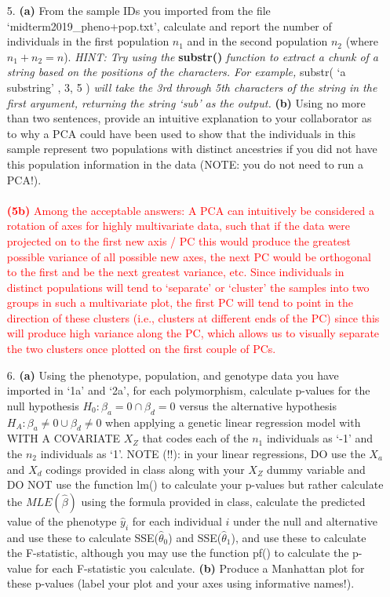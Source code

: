 \documentclass[letterpaper, 11pt]{article}
\begin{document}
\begin{itemize}
\item[5.] \textbf{(a)} From the sample IDs you imported from the file `midterm2019\_pheno+pop.txt', calculate and report the number of individuals in the first population $n_1$ and in the second population $n_2$ (where $n_1 + n_2 = n$).  \textit{ HINT: Try using the }\textbf{substr()} \textit{function to extract a chunk of a string based on the positions of the characters. For example, } substr( `a substring' , 3, 5 ) \textit{ will take the 3rd through 5th characters of the string in the first argument, returning the string `sub' as the output.} \textbf{(b)} Using no more than two sentences, provide an intuitive explanation to your collaborator as to why a PCA could have been used to show that the individuals in this sample represent two populations with distinct ancestries if you did not have this population information in the data (NOTE: you do not need to run a PCA!).
\\
\\
 \textcolor{red}{ 
\textbf{(5b)} Among the acceptable answers: A PCA can intuitively be considered a rotation of axes for highly multivariate data, such that if the data were projected on to the first new axis / PC this would produce the greatest possible variance of all possible new axes, the next PC would be orthogonal to the first and be the next greatest variance, etc.  Since individuals in distinct populations will tend to `separate' or `cluster' the samples into two groups in such a multivariate plot, the first PC will tend to point in the direction of these clusters (i.e., clusters at different ends of the PC) since this will produce high variance along the PC, which allows us to visually separate the two clusters once plotted on the first couple of PCs.
} 

\item[6.] \textbf{(a)} Using the phenotype, population, and genotype data you have imported in `1a' and `2a', for each polymorphism, calculate p-values for the null hypothesis $H_0: \beta_a = 0 \cap \beta_d=0$ versus the alternative hypothesis $H_A: \beta_a \neq 0 \cup \beta_d \neq 0$ when applying a genetic linear regression model with WITH A COVARIATE $X_Z$ that codes each of the $n_1$ individuals as `-1' and the $n_2$ individuals as `1'.  NOTE (!!): in your linear regressions, DO use the $X_a$ and $X_d$ codings provided in class along with your $X_Z$ dummy variable and DO NOT use the function lm() to calculate your p-values but rather calculate the $MLE(\hat{\beta})$ using the formula provided in class, calculate the predicted value of the phenotype $\hat{y}_i$ for each individual $i$ under the null and alternative and use these to calculate SSE($\hat{\theta}_0$) and SSE($\hat{\theta}_1$), and use these to calculate the F-statistic, although you may use the function pf() to calculate the p-value for each F-statistic you calculate. \textbf{(b)} Produce a Manhattan plot for these p-values (label your plot and your axes using informative names!).  


\end{itemize}
\end{document}
